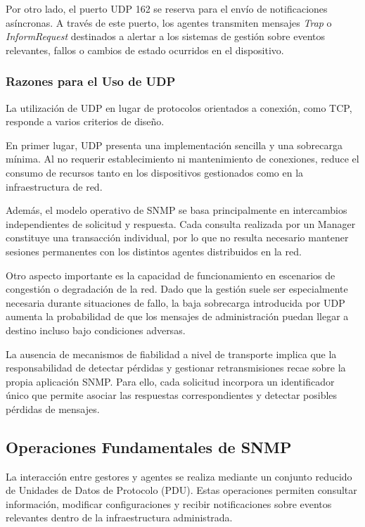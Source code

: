 Por otro lado, el puerto UDP 162 se reserva para el envío de notificaciones asíncronas. A través de este puerto, los agentes transmiten mensajes \textit{Trap} o \textit{InformRequest} destinados a alertar a los sistemas de gestión sobre eventos relevantes, fallos o cambios de estado ocurridos en el dispositivo.

\subsubsection{Razones para el Uso de UDP}

La utilización de UDP en lugar de protocolos orientados a conexión, como TCP, responde a varios criterios de diseño.

En primer lugar, UDP presenta una implementación sencilla y una sobrecarga mínima. Al no requerir establecimiento ni mantenimiento de conexiones, reduce el consumo de recursos tanto en los dispositivos gestionados como en la infraestructura de red.

Además, el modelo operativo de SNMP se basa principalmente en intercambios independientes de solicitud y respuesta. Cada consulta realizada por un Manager constituye una transacción individual, por lo que no resulta necesario mantener sesiones permanentes con los distintos agentes distribuidos en la red.

Otro aspecto importante es la capacidad de funcionamiento en escenarios de congestión o degradación de la red. Dado que la gestión suele ser especialmente necesaria durante situaciones de fallo, la baja sobrecarga introducida por UDP aumenta la probabilidad de que los mensajes de administración puedan llegar a destino incluso bajo condiciones adversas.

La ausencia de mecanismos de fiabilidad a nivel de transporte implica que la responsabilidad de detectar pérdidas y gestionar retransmisiones recae sobre la propia aplicación SNMP. Para ello, cada solicitud incorpora un identificador único que permite asociar las respuestas correspondientes y detectar posibles pérdidas de mensajes.

\subsection{Operaciones Fundamentales de SNMP}

La interacción entre gestores y agentes se realiza mediante un conjunto reducido de Unidades de Datos de Protocolo (PDU). Estas operaciones permiten consultar información, modificar configuraciones y recibir notificaciones sobre eventos relevantes dentro de la infraestructura administrada.

